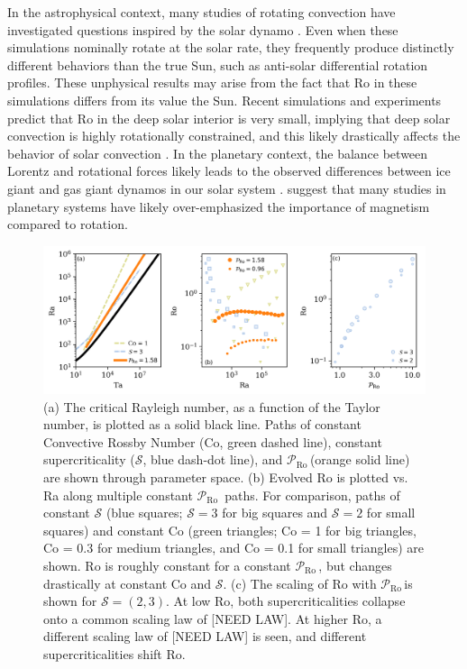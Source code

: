 \documentclass[twocolumn, amsmath, amsfonts, amssymb]{aastex62}
\newcommand{\pro}{\ensuremath{\mathcal{P}_{\text{Ro}}\,}}
\begin{document}
In the astrophysical context,
many studies of rotating convection have investigated questions inspired by the solar dynamo
\citep{glatzmaier&gilman1982, busse2002, brown&all2008,
brown&all2010, brown&all2011, augustson&all2012, guerrero&all2013, kapyla&all2014}.
Even when these simulations nominally rotate at the solar rate,
they frequently produce distinctly different behaviors than the true Sun,
such as anti-solar differential rotation profiles.
These unphysical results may arise from the fact that Ro in these simulations differs from
its value the Sun. Recent simulations and experiments predict
that Ro in the deep solar interior is very small, implying that deep solar convection
is highly rotationally constrained, and this likely drastically
affects the behavior of solar convection
\citep{featherstone&hindman2016, greer&all2016}.
In the planetary context, the balance between Lorentz
and rotational forces likely leads to the observed differences between ice
giant and gas giant dynamos in our solar system \citep{soderlund&all2015}.
\cite{aurnou&king2017} suggest that many studies in planetary systems
have likely over-emphasized the importance of magnetism compared to rotation.

\begin{figure}[t!]
\includegraphics[width=\textwidth]{parameter_space.png}
\caption{(a) The critical Rayleigh number, as a function of the Taylor number, 
is plotted as a solid black line. Paths of constant Convective Rossby Number
(Co, green dashed line), constant supercriticality ($\mathcal{S}$, blue dash-dot line), and 
\pro (orange solid line) are shown through parameter space. (b) Evolved
Ro is plotted vs. Ra along multiple constant \pro
paths. For comparison, paths of constant $\mathcal{S}$ (blue squares; $\mathcal{S} = 3$ for
big squares and $\mathcal{S} = 2$ for small squares)
and constant Co (green triangles; Co = 1 for big triangles, Co = 0.3 for medium triangles,
and Co = 0.1 for small triangles) are shown.
Ro is roughly constant for a constant \pro, but changes drastically at constant Co and 
$\mathcal{S}$.
(c) The scaling of Ro with \pro is shown for $\mathcal{S} = (2,3)$.
At low Ro, both supercriticalities collapse onto a common scaling law of [NEED LAW].
At higher Ro, a different scaling law of [NEED LAW] is seen, and different supercriticalities
shift Ro.
\label{fig:parameter_space} }
\end{figure}
\end{document}
